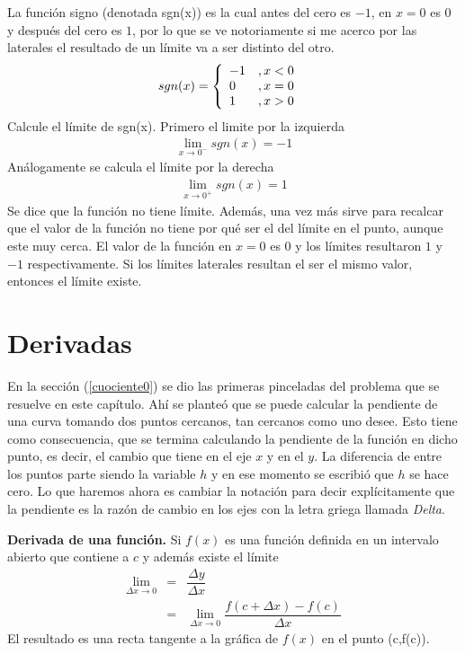 \begin{myexample}
La función signo (denotada sgn(x)) es la cual antes del cero es $-1$, en $x=0$ es $0$ y después del cero es $1$, por lo que se ve notoriamente si me acerco por las laterales el resultado de un límite va a ser distinto del otro. 
\begin{eqnarray*}
sgn(x)= \left\{\begin{array}{ll}
-1&, x< 0\\
0 &, x=0\\ 
1 &, x>0 \\
\end{array} \hspace{6px} \right.
\end{eqnarray*}
Calcule el límite de sgn(x). Primero el limite por la izquierda
\begin{eqnarray*}
\lim_{x\rightarrow 0^{-}}sgn(x)=-1
\end{eqnarray*}
Análogamente se calcula el límite por la derecha
\begin{eqnarray*}
\lim_{x\rightarrow 0^{+}}sgn(x)=1
\end{eqnarray*}
Se dice que la función no tiene límite. Además, una vez más sirve para recalcar que el valor de la función no tiene por qué ser el del límite en el punto, aunque este muy cerca. El valor de la función en $x=0$ es $0$ y los límites resultaron $1$ y $-1$ respectivamente. Si los límites laterales resultan el ser el mismo valor, entonces el límite existe. 
\end{myexample}

\section{Derivadas}

En la sección (\ref{cuociente0}) se dio las primeras pinceladas del problema que se resuelve en este capítulo. Ahí se planteó que se puede calcular  la pendiente de una curva tomando dos puntos cercanos, tan cercanos como uno desee. Esto tiene como consecuencia, que se termina calculando la pendiente de la función en dicho punto, es decir, el cambio que tiene en el eje $x$ y en el $y$. La diferencia de entre los puntos parte siendo la variable $h$ y en ese momento se escribió que $h$ se hace cero. Lo que haremos ahora es cambiar la notación para decir explícitamente que la pendiente es la razón de cambio en los ejes con la letra griega llamada \textit{Delta}.
\begin{mydef}
\textbf{Derivada de una función. } Si $f(x)$ es una función definida en un intervalo abierto que contiene a $c$ y además existe el límite
\begin{eqnarray}
\lim_{\Delta x\rightarrow 0 } &=&\dfrac{\Delta y}{\Delta x}\\
&=&  \lim_{\Delta x\rightarrow 0 }\dfrac{f(c+\Delta x)-f(c)}{\Delta x}
\label{limite0}
\end{eqnarray}
El resultado es una recta tangente a la gráfica de $f(x)$ en el punto (c,f(c)).
\end{mydef}

